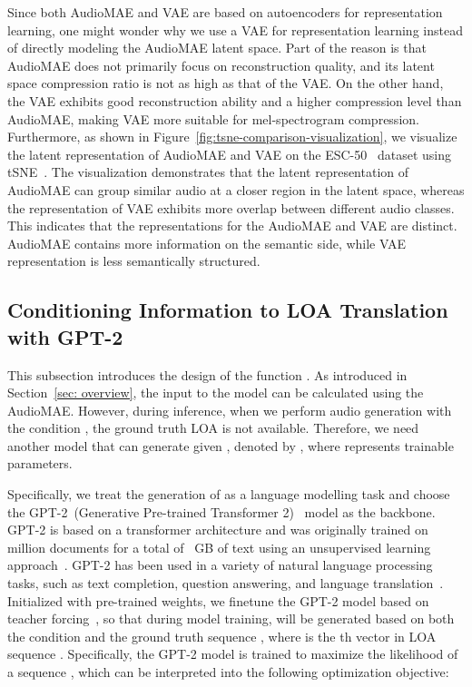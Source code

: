 \documentclass[lettersize,journal]{IEEEtran}
\begin{document}
Since both AudioMAE and VAE are based on autoencoders for representation learning, one might wonder why we use a VAE for representation learning instead of directly modeling the AudioMAE latent space.
Part of the reason is that AudioMAE does not primarily focus on reconstruction quality, and its latent space compression ratio is not as high as that of the VAE. On the other hand, the VAE exhibits good reconstruction ability and a higher compression level than AudioMAE, making VAE more suitable for mel-spectrogram compression.
Furthermore, as shown in Figure~\ref{fig:tsne-comparison-visualization}, we visualize the latent representation of AudioMAE and VAE on the ESC-50~\cite{piczak2015esc} dataset using tSNE~\cite{van2008visualizing-tsne}. The visualization demonstrates that the latent representation of AudioMAE can group similar audio at a closer region in the latent space, whereas the representation of VAE exhibits more overlap between different audio classes. This indicates that the representations for the AudioMAE and VAE are distinct. AudioMAE contains more information on the semantic side, while VAE representation is less semantically structured. 



\subsection{Conditioning Information to LOA Translation with GPT-2}
\label{sec: audio semantic language modeling}

\noindent
This subsection introduces the design of the function . As introduced in Section~\ref{sec: overview}, the input to the model  can be calculated using the AudioMAE. However, during inference, when we perform audio generation with the condition , the ground truth LOA  is not available. Therefore, we need another model that can generate  given , denoted by , where  represents trainable parameters. 



Specifically, we treat the generation of  as a language modelling task and choose the GPT-2~(Generative Pre-trained Transformer 2)~\cite{radford2019language} model as the backbone. GPT-2 is based on a transformer architecture and was originally trained on  million documents for a total of ~GB of text using an unsupervised learning approach~\cite{radford2019language}. 
GPT-2 has been used in a variety of natural language processing tasks, such as text completion, question answering, and language translation~\cite{qu2020text,klein2019learning}. 
Initialized with pre-trained weights, we finetune the GPT-2 model based on teacher forcing~\cite{lamb2016professor}, so that during model training,  will be generated based on both the condition  and the ground truth sequence , where  is the th vector in LOA sequence . Specifically, the GPT-2 model  is trained to maximize the likelihood of a sequence , which can be interpreted into the following optimization objective:
\end{document}
